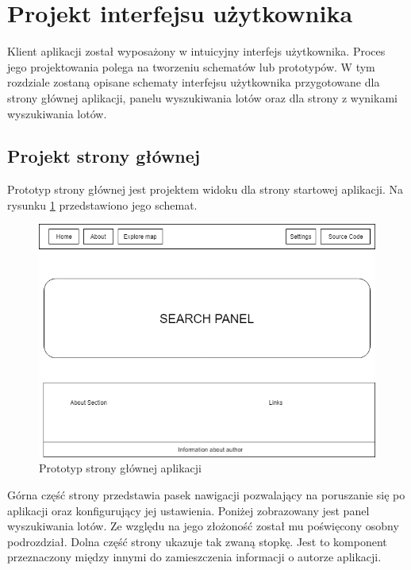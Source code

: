 \documentclass[12pt, twoside]{report}
\begin{document}
\section{Projekt interfejsu użytkownika}
Klient aplikacji został wyposażony w intuicyjny interfejs użytkownika. Proces jego projektowania polega na tworzeniu schematów lub prototypów. W tym rozdziale zostaną opisane schematy interfejsu użytkownika przygotowane dla strony głównej aplikacji, panelu wyszukiwania lotów oraz dla strony z wynikami wyszukiwania lotów.
\subsection{Projekt strony głównej}
Prototyp strony głównej jest projektem widoku dla strony startowej aplikacji. Na rysunku \ref{fig:main_page_schema} przedstawiono jego schemat.

\begin{figure}[!ht]
\centering
\includegraphics[scale=0.50, keepaspectratio]{main_page_interface_project.PNG}
\caption{Prototyp strony głównej aplikacji}
\label{fig:main_page_schema}
\end{figure}

Górna część strony przedstawia pasek nawigacji pozwalający na poruszanie się po aplikacji oraz konfigurujący jej ustawienia. Poniżej zobrazowany jest panel wyszukiwania lotów. Ze względu na jego złożoność został mu poświęcony osobny podrozdział. Dolna część strony ukazuje tak zwaną stopkę. Jest to komponent przeznaczony między innymi do zamieszczenia informacji o autorze aplikacji.
\end{document}
